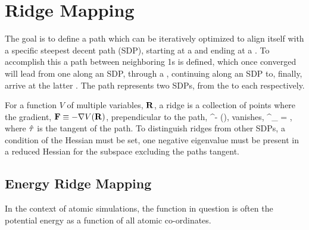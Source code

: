 \section{Ridge Mapping}
The goal is to define a path which can be iteratively optimized to align itself with a specific steepest decent path (SDP),
starting at a  and ending at a .
To accomplish this a path between neighboring \sap1s is defined,
which once converged will lead from one  along an SDP,
through a ,
continuing along an SDP to, finally, arrive at the latter .
The path represents two SDPs, from the  to each  respectively.

For a function $V$ of multiple variables, $\mathbf{R}$, a ridge is a collection of points where the gradient, $\mathbf{F} \equiv -\nabla V(\mathbf{R})$, prependicular to the path,
\beq
\vF^\perp \equiv \vF - (\vF \cdot \uvt)\uvt,
\eeq
vanishes,
\beq
\vF^\perp_ = ,
\eeq
where $\hat{\mathbf{\tau}}$ is the tangent of the path.
To distinguish ridges from other SDPs, a condition of the Hessian must be set, one negative eigenvalue must be present in a reduced Hessian for the subspace excluding the paths tangent.





\incomplete




\subsection{Energy Ridge Mapping}
In the context of atomic simulations, the function in question is often the potential energy as a function of all atomic co-ordinates.





\incomplete



